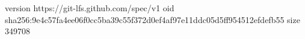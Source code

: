 version https://git-lfs.github.com/spec/v1
oid sha256:9e4c57fa4ee06f0cc5ba39c55f372d0ef4af97e11ddc05d5ff954512efdefb55
size 349708
